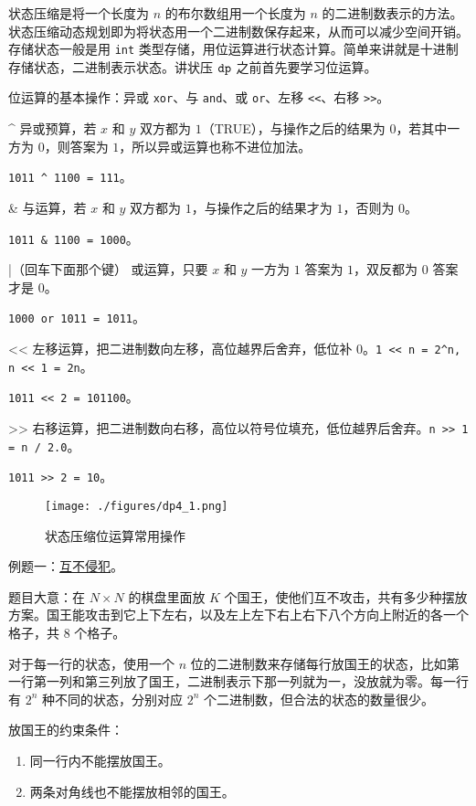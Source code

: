 
状态压缩是将一个长度为 $n$ 的布尔数组用一个长度为 $n$ 的二进制数表示的方法。状态压缩动态规划即为将状态用一个二进制数保存起来，从而可以减少空间开销。存储状态一般是用 \verb|int| 类型存储，用位运算进行状态计算。简单来讲就是十进制存储状态，二进制表示状态。讲状压 $\tt dp$ 之前首先要学习位运算。

位运算的基本操作：异或 \verb|xor|、与 \verb|and|、或 \verb|or|、左移 \verb|<<|、右移 \verb|>>|。

^ 异或预算，若 $x$ 和 $y$ 双方都为 $1$（TRUE），与操作之后的结果为 $0$，若其中一方为 $0$，则答案为 $1$，所以异或运算也称不进位加法。

\verb|1011 ^ 1100 = 111|。

& 与运算，若 $x$ 和 $y$ 双方都为 $1$，与操作之后的结果才为 $1$，否则为 $0$。

\verb|1011 & 1100 = 1000|。

|（回车下面那个键） 或运算，只要 $x$ 和 $y$ 一方为 $1$ 答案为 $1$，双反都为 $0$ 答案才是 $0$。

\verb|1000 or 1011 = 1011|。

<< 左移运算，把二进制数向左移，高位越界后舍弃，低位补 $0$。\verb|1 << n = 2^n, n << 1 = 2n|。

\verb|1011 << 2 = 101100|。

>> 右移运算，把二进制数向右移，高位以符号位填充，低位越界后舍弃。\verb|n >> 1 = n / 2.0|。

\verb|1011 >> 2 = 10|。

\begin{figure}[ht]
\centering
\texttt{[image: ./figures/dp4\_1.png]}
\caption{状态压缩位运算常用操作} \label{dp4_fig1}
\end{figure}

例题一：\href{https://loj.ac/p/2153}{互不侵犯}。

题目大意：在 $N \times N$ 的棋盘里面放 $K$ 个国王，使他们互不攻击，共有多少种摆放方案。国王能攻击到它上下左右，以及左上左下右上右下八个方向上附近的各一个格子，共 $8$ 个格子。

对于每一行的状态，使用一个 $n$ 位的二进制数来存储每行放国王的状态，比如第一行第一列和第三列放了国王，二进制表示下那一列就为一，没放就为零。每一行有 $2^n$ 种不同的状态，分别对应 $2^n$ 个二进制数，但合法的状态的数量很少。

放国王的约束条件：
\begin{enumerate}
\item 同一行内不能摆放国王。
\item 两条对角线也不能摆放相邻的国王。
\end{enumerate}

